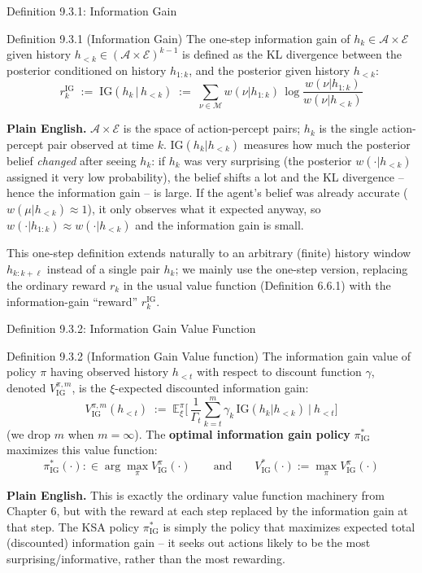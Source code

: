\documentclass[aspectratio=169,10pt]{beamer}
\newcommand{\E}{\mathbb{E}}
\newcommand{\IG}{\mathrm{IG}}
\begin{document}
\begin{frame}{Definition 9.3.1: Information Gain}
  \begin{block}{Definition 9.3.1 (Information Gain)}
    The one-step information gain of $h_k\in\mathcal{A}\times\mathcal{E}$
    given history $h_{<k}\in(\mathcal{A}\times\mathcal{E})^{k-1}$ is defined
    as the KL divergence between the posterior conditioned on history
    $h_{1:k}$, and the posterior given history $h_{<k}$:
    \[
      r_k^{\IG} \;:=\; \IG(h_k\,|\,h_{<k}) \;:=\; \sum_{\nu\in\mathcal{M}} w(\nu|h_{1:k})\, \log\frac{w(\nu|h_{1:k})}{w(\nu|h_{<k})}
    \]
  \end{block}
  \textbf{Plain English.} $\mathcal{A}\times\mathcal{E}$ is the space of
  action-percept pairs; $h_k$ is the single action-percept pair observed at
  time $k$. $\IG(h_k|h_{<k})$ measures how much the posterior belief
  \emph{changed} after seeing $h_k$: if $h_k$ was very surprising (the
  posterior $w(\cdot|h_{<k})$ assigned it very low probability), the belief
  shifts a lot and the KL divergence -- hence the information gain -- is
  large. If the agent's belief was already accurate
  ($w(\mu|h_{<k})\approx1$), it only observes what it expected anyway, so
  $w(\cdot|h_{1:k})\approx w(\cdot|h_{<k})$ and the information gain is
  small.

  \vspace{0.3em}
  This one-step definition extends naturally to an arbitrary (finite)
  history window $h_{k:k+\ell}$ instead of a single pair $h_k$; we mainly
  use the one-step version, replacing the ordinary reward $r_k$ in the
  usual value function (Definition 6.6.1) with the information-gain
  ``reward'' $r_k^{\IG}$.
\end{frame}

\begin{frame}{Definition 9.3.2: Information Gain Value Function}
  \begin{block}{Definition 9.3.2 (Information Gain Value function)}
    The information gain value of policy $\pi$ having observed history
    $h_{<t}$ with respect to discount function $\gamma$, denoted
    $V^{\pi,m}_{\IG}$, is the $\xi$-expected discounted information gain:
    \[
      V^{\pi,m}_{\IG}(h_{<t}) \;:=\; \E^\pi_\xi\Big[\,\frac{1}{\Gamma_t}\sum_{k=t}^{m}\gamma_k\,\IG(h_k|h_{<k})\ \Big|\ h_{<t}\Big]
    \]
    (we drop $m$ when $m=\infty$). The \textbf{optimal information gain
    policy} $\pi^*_{\IG}$ maximizes this value function:
    \[
      \pi^*_{\IG}(\cdot) :\in \arg\max_\pi V^\pi_{\IG}(\cdot) \qquad\text{and}\qquad V^*_{\IG}(\cdot) := \max_\pi V^\pi_{\IG}(\cdot)
    \]
  \end{block}
  \textbf{Plain English.} This is exactly the ordinary value function
  machinery from Chapter 6, but with the reward at each step replaced by
  the information gain at that step. The KSA policy $\pi^*_{\IG}$ is simply
  the policy that maximizes expected total (discounted) information gain
  -- it seeks out actions likely to be the most surprising/informative,
  rather than the most rewarding.
\end{frame}
\end{document}
